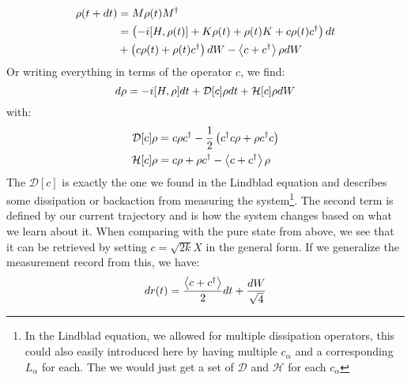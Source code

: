\begin{align}
    \rho(t+dt) &= M \rho(t) M^\dagger \\
               &= \left(-i \comm{H}{\rho(t)} + K\rho(t) + \rho(t)K + c\rho(t)c^\dagger \right) dt \\
            &+\left(c\rho(t) + \rho(t)c^\dagger\right)dW  - \expval{c + c^\dagger}\rho dW
\end{align}
Or writing everything in terms of the operator $c$, we find:
\begin{equation}
    d\rho = -i \comm{H}{\rho}dt + \mathcal{D}[c]\rho dt + \mathcal{H}[c] \rho dW
\end{equation}
with:
\begin{align}
    \mathcal{D}[c] \rho &= c\rho c^\dagger - \frac12 \left(c^\dagger c \rho + \rho c^\dagger c\right) \\ 
    \mathcal{H}[c] \rho &= c\rho + \rho c^\dagger - \expval{c + c^\dagger}\rho
\end{align}
The $\mathcal{D}[c]$ is exactly the one we found in the Lindblad equation and describes some dissipation or backaction from measuring the system\footnote{In the Lindblad equation, we allowed for multiple dissipation operators, this could also easily introduced here by having multiple $c_\alpha$ and a corresponding $L_\alpha$ for each. The we would just get a set of $\mathcal{D}$ and $\mathcal{H}$ for each $c_\alpha$}. The second term is defined by our current trajectory and is how the system changes based on what we learn about it. When comparing with the pure state from above, we see that it can be retrieved by setting $c = \sqrt{2k}X$ in the general form. If we generalize the measurement record from this, we have\cite{jacobs_straightforward_2006}:
\begin{equation}
    dr(t) = \frac{\expval{c + c^\dagger}}{2}dt + \frac{dW}{\sqrt{4}}
\end{equation}


